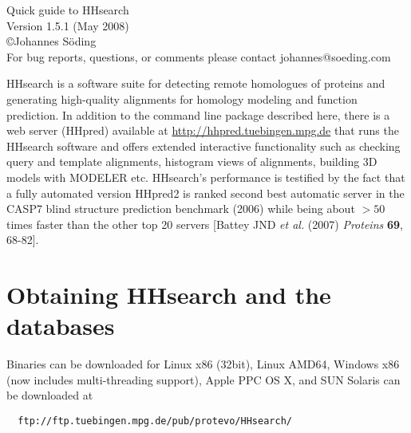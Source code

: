 \documentclass[11pt,a4paper]{article}
\begin{document}


\begin{center}

\vspace{30mm}
{\Huge Quick guide to HHsearch}\\[2mm]
  Version 1.5.1 (May 2008)\\[2mm]
\copyright  Johannes S\"oding\\[2mm]
For bug reports, questions, or comments please contact johannes@soeding.com
\end{center}

{\noindent HHsearch is a software suite for detecting remote homologues of proteins and generating high-quality alignments for homology modeling and function prediction. In addition to the command line package described here, there is a web server (HHpred) available at \url{http://hhpred.tuebingen.mpg.de} that runs the HHsearch software and offers extended interactive functionality such as checking query and template alignments, histogram views of alignments, building 3D models with MODELER etc. HHsearch's performance is testified by the fact that a fully automated version HHpred2 is ranked second best automatic server in the CASP7 blind structure prediction benchmark (2006) while being about $>50$ times faster than the other top 20 servers [Battey JND \emph{et al.} (2007) \emph{Proteins} {\bf 69}, 68-82].}

\newpage

\setlength{\parskip}{0mm}
\tableofcontents
\setlength{\parskip}{2mm}

\newpage

\section{Obtaining HHsearch and the databases}

Binaries can be downloaded for Linux x86 (32bit), Linux AMD64, Windows x86 (now includes multi-threading support),
Apple PPC OS X, and SUN Solaris can be downloaded at
\begin{verbatim}
  ftp://ftp.tuebingen.mpg.de/pub/protevo/HHsearch/
\end{verbatim}
\end{document}
